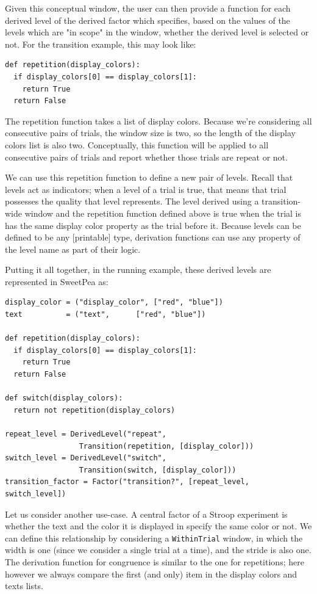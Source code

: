 Given this conceptual window, the user can then provide a function for each derived level of the derived factor which specifies, based on the values of the levels which are "in scope" in the window, whether the derived level is selected or not. For the transition example, this may look like:

\begin{verbatim}
def repetition(display_colors):
  if display_colors[0] == display_colors[1]:
    return True
  return False
\end{verbatim}

The repetition function takes a list of display colors. Because we're considering all consecutive pairs of trials, the window size is two, so the length of the display colors list is also two. Conceptually, this function will be applied to all consecutive pairs of trials and report whether those trials are repeat or not.

We can use this repetition function to define a new pair of levels. Recall that levels act as indicators; when a level of a trial is true, that means that trial possesses the quality that level represents. The level derived using a transition-wide window and the repetition function defined above is true when the trial is has the same display color property as the trial before it. Because levels can be defined to be any [printable] type, derivation functions can use any property of the level name as part of their logic.

Putting it all together, in the running example, these derived levels are represented in SweetPea as:

\begin{verbatim}
display_color = ("display_color", ["red", "blue"])
text          = ("text",      ["red", "blue"])

def repetition(display_colors):
  if display_colors[0] == display_colors[1]:
    return True
  return False

def switch(display_colors):
  return not repetition(display_colors)

repeat_level = DerivedLevel("repeat",
                 Transition(repetition, [display_color]))
switch_level = DerivedLevel("switch",
                 Transition(switch, [display_color]))
transition_factor = Factor("transition?", [repeat_level, switch_level])

\end{verbatim}

Let us consider another use-case. A central factor of a Stroop experiment is whether the text and the color it is displayed in specify the same color or not. We can define this relationship by considering a \texttt{WithinTrial} window, in which the width is one (since we consider a single trial at a time), and the stride is also one. The derivation function for congruence is similar to the one for repetitions; here however we always compare the first (and only) item in the display colors and texts lists.

